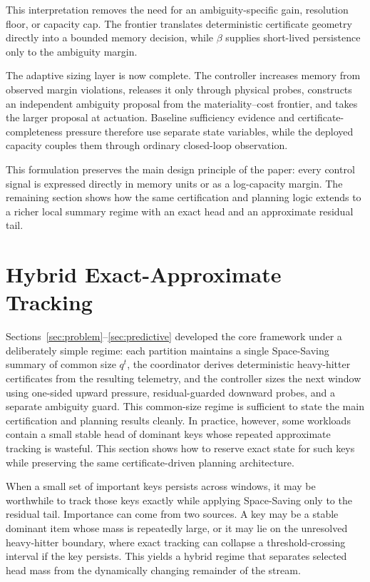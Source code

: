 \documentclass[sigconf, nonacm]{acmart}
\begin{document}
This interpretation removes the need for an ambiguity-specific gain, resolution floor, or capacity cap. The frontier translates deterministic certificate geometry directly into a bounded memory decision, while \(\beta\) supplies short-lived persistence only to the ambiguity margin.

The adaptive sizing layer is now complete. The controller increases memory from observed margin violations, releases it only through physical probes, constructs an independent ambiguity proposal from the materiality--cost frontier, and takes the larger proposal at actuation. Baseline sufficiency evidence and certificate-completeness pressure therefore use separate state variables, while the deployed capacity couples them through ordinary closed-loop observation.

This formulation preserves the main design principle of the paper: every control signal is expressed directly in memory units or as a log-capacity margin. The remaining section shows how the same certification and planning logic extends to a richer local summary regime with an exact head and an approximate residual tail.

\section{Hybrid Exact-Approximate Tracking}
\label{sec:extensions}

Sections~\ref{sec:problem}--\ref{sec:predictive} developed the core framework under a deliberately simple regime: each partition maintains a single Space-Saving summary of common size \(q^t\), the coordinator derives deterministic heavy-hitter certificates from the resulting telemetry, and the controller sizes the next window using one-sided upward pressure, residual-guarded downward probes, and a separate ambiguity guard. This common-size regime is sufficient to state the main certification and planning results cleanly. In practice, however, some workloads contain a small stable head of dominant keys whose repeated approximate tracking is wasteful. This section shows how to reserve exact state for such keys while preserving the same certificate-driven planning architecture.

When a small set of important keys persists across windows, it may be worthwhile to track those keys exactly while applying Space-Saving only to the residual tail. Importance can come from two sources. A key may be a stable dominant item whose mass is repeatedly large, or it may lie on the unresolved heavy-hitter boundary, where exact tracking can collapse a threshold-crossing interval if the key persists. This yields a hybrid regime that separates selected head mass from the dynamically changing remainder of the stream.
\end{document}
